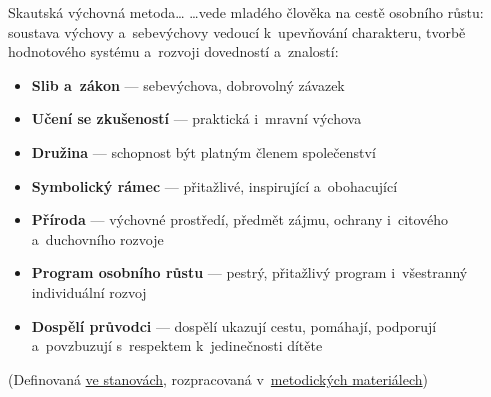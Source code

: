 \documentclass[hyperref={bookmarks=true, unicode=true, colorlinks=true, plainpages=false, pdfkeywords={Skaut, Junak, Skauting, Vychovna metoda}, linkcolor=OrangeRed, anchorcolor=OrangeRed, citecolor=RawSienna, filecolor=RawSienna, menucolor=OrangeRed, urlcolor=RawSienna, pdftex}, compress, xelatex, xcolor=dvipsnames, print]{beamer}
\begin{document}
\begin{frame}{Skautská výchovná metoda\ldots}
\ldots vede mladého člověka na cestě osobního růstu: soustava výchovy a~sebevýchovy vedoucí k~upevňování charakteru, tvorbě hodnotového systému a~rozvoji dovedností a~znalostí:
\begin{itemize}
 \item \textbf{Slib a~zákon} --- sebevýchova, dobrovolný závazek
 \item \textbf{Učení se zkušeností} --- praktická i~mravní výchova
 \item \textbf{Družina} --- schopnost být platným členem společenství
 \item \textbf{Symbolický rámec} --- přitažlivé, inspirující a~obohacující
 \item \textbf{Příroda} --- výchovné prostředí, předmět zájmu, ochrany i~citového a~duchovního rozvoje
 \item \textbf{Program osobního růstu} --- pestrý, přitažlivý program i~všestranný individuální rozvoj
 \item \textbf{Dospělí průvodci} --- dospělí ukazují cestu, pomáhají, podporují a~povzbuzují s~respektem k~jedinečnosti dítěte
\end{itemize}
\begin{tiny}(Definovaná \href{http://krizovatka.skaut.cz/stredisko/novy-obcansky-zakonik-stanovy/nove-stanovy}{ve stanovách}, rozpracovaná v~\href{http://krizovatka.skaut.cz/oddil/program/skauti-skautky}{metodických materiálech})\end{tiny}
\end{frame}
\end{document}
